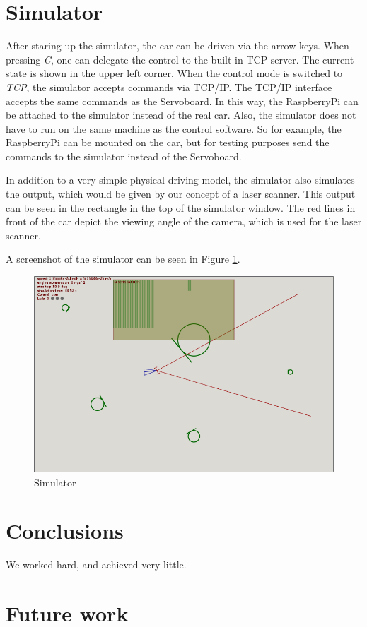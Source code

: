 \documentclass[a4paper
               ,10pt
               ,DIV=10 %
               ,BCOR=0.3cm
               ,pagesize %
               ,headings=small
               ,bibtotoc
               ]
               {scrartcl}
\begin{document}
\section{Simulator}


After staring up the simulator, the car can be driven via the arrow keys. When pressing \textit{C}, one can delegate the control to the built-in TCP server. The current state is shown in the upper left corner.
When the control mode is switched to \textit{TCP}, the simulator accepts commands via TCP/IP.
The TCP/IP interface accepts the same commands as the Servoboard.
In this way, the RaspberryPi can be attached to the simulator instead of the real car.
Also, the simulator does not have to run on the same machine as the control software.
So for example, the RaspberryPi can be mounted on the car, but for testing purposes send the commands to the simulator instead of the Servoboard.

In addition to a very simple physical driving model, the simulator also simulates the output, which would be given by our concept of a laser scanner. This output can be seen in the rectangle in the top of the simulator window. The red lines in front of the car depict the viewing angle of the camera, which is used for the laser scanner.

A screenshot of the simulator can be seen in Figure \ref{figsim}.

\begin{figure}[H]
\begin{center}
\includegraphics[width=15cm]{pic/sim.png}
\end{center}
\caption{Simulator}
\label{figsim}
\end{figure}




\section{Conclusions}\label{conclusions}
We worked hard, and achieved very little.

\section{Future work}



\end{document}
